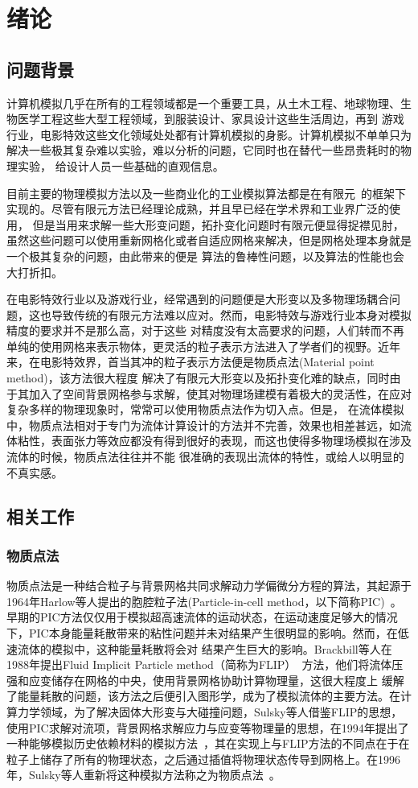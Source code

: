 
\chapter{绪论}
\label{chap_int}
\section{问题背景}
计算机模拟几乎在所有的工程领域都是一个重要工具，从土木工程、地球物理、生物医学工程这些大型工程领域，到服装设计、家具设计这些生活周边，再到
游戏行业，电影特效这些文化领域处处都有计算机模拟的身影。计算机模拟不单单只为解决一些极其复杂难以实验，难以分析的问题，它同时也在替代一些昂贵耗时的物理实验，
给设计人员一些基础的直观信息。

目前主要的物理模拟方法以及一些商业化的工业模拟算法都是在有限元~\cite{1942Variational}的框架下实现的。尽管有限元方法已经理论成熟，并且早已经在学术界和工业界广泛的使用，
但是当用来求解一些大形变问题，拓扑变化问题时有限元便显得捉襟见肘，虽然这些问题可以使用重新网格化或者自适应网格来解决，但是网格处理本身就是一个极其复杂的问题，由此带来的便是
算法的鲁棒性问题，以及算法的性能也会大打折扣。

在电影特效行业以及游戏行业，经常遇到的问题便是大形变以及多物理场耦合问题，这也导致传统的有限元方法难以应对。然而，电影特效与游戏行业本身对模拟精度的要求并不是那么高，对于这些
对精度没有太高要求的问题，人们转而不再单纯的使用网格来表示物体，更灵活的粒子表示方法进入了学者们的视野。近年来，在电影特效界，首当其冲的粒子表示方法便是物质点法(Material point method)，该方法很大程度
解决了有限元大形变以及拓扑变化难的缺点，同时由于其加入了空间背景网格参与求解，使其对物理场建模有着极大的灵活性，在应对复杂多样的物理现象时，常常可以使用物质点法作为切入点。但是，
在流体模拟中，物质点法相对于专门为流体计算设计的方法并不完善，效果也相差甚远，如流体粘性，表面张力等效应都没有得到很好的表现，而这也使得多物理场模拟在涉及流体的时候，物质点法往往并不能
很准确的表现出流体的特性，或给人以明显的不真实感。
\section{相关工作}
\subsection{物质点法}
物质点法是一种结合粒子与背景网格共同求解动力学偏微分方程的算法，其起源于1964年Harlow等人提出的胞腔粒子法(Particle-in-cell method，以下简称PIC)~\cite{harlow1962particle}。
早期的PIC方法仅仅用于模拟超高速流体的运动状态，在运动速度足够大的情况下，PIC本身能量耗散带来的粘性问题并未对结果产生很明显的影响。然而，在低速流体的模拟中，这种能量耗散将会对
结果产生巨大的影响。Brackbill等人在1988年提出Fluid Implicit Particle method（简称为FLIP）~\cite{brackbill1988flip}方法，他们将流体压强和应变储存在网格的中央，使用背景网格协助计算物理量，这很大程度上
缓解了能量耗散的问题，该方法之后便引入图形学，成为了模拟流体的主要方法。在计算力学领域，为了解决固体大形变与大碰撞问题，Sulsky等人借鉴FLIP的思想，使用PIC求解对流项，背景网格求解应力与应变等物理量的思想，在1994年提出了
一种能够模拟历史依赖材料的模拟方法~\cite{sulsky1994particle}，其在实现上与FLIP方法的不同点在于在粒子上储存了所有的物理状态，之后通过插值将物理状态传导到网格上。在1996年，Sulsky等人重新将这种模拟方法称之为物质点法~\cite{sulsky1996axisymmetric}。

